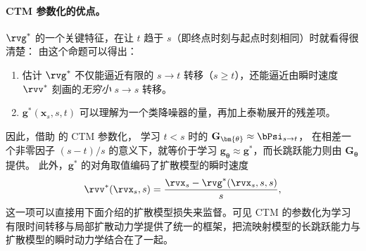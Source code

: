 \paragraph{CTM 参数化的优点。}
$\rvg^*$ 的一个关键特征，在让 $t$ 趋于 $s$（即终点时刻与起点时刻相同）时就看得很清楚：
由这个命题可以得出：
\begin{enumerate}
    \item 估计 $\rvg^*$ 不仅能逼近有限的 $s\to t$ 转移（$s \ge t$），还能逼近由瞬时速度 $\rvv^*$ 刻画的\textit{无穷小} $s\to s$ 转移。
    \item $\mathbf{g}^*(\mathbf{x}_{s},s,t)$ 可以理解为一个类降噪器的量，再加上泰勒展开的残差项。
\end{enumerate}
因此，借助  的 CTM 参数化，
学习 $t<s$ 时的 $\mathbf{G}_{\bm{\theta}} \approx \bPsi_{s\to t}$，
在相差一个非零因子 $(s-t)/s$ 的意义下，就等价于学习
$\mathbf{g}_{\bm{\theta}} \approx \mathbf{g}^*$，而长跳跃能力则由 $\mathbf{G}_{\bm{\theta}}$ 提供。
此外，$\mathbf{g}^*$ 的对角取值编码了扩散模型的瞬时速度
\[
\rvv^*(\rvx_s,s)
=
\frac{\rvx_s-\rvg^*(\rvx_s,s,s)}{s},
\]
这一项可以直接用下面介绍的扩散模型损失来监督。可见 CTM 的参数化为学习有限时间转移与局部扩散动力学提供了统一的框架，把流映射模型的长跳跃能力与扩散模型的瞬时动力学结合在了一起。



